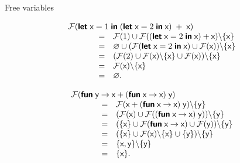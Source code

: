 %
\begin{frame}{Free variables}

  \begin{equation*}
    \begin{array}{lcl}
      \multicolumn{3}{l}{
        \FV{\Xlet \; \textsf{x} = 1 \;
          \Xin \; (\Xlet \; \textsf{x} = 2 \;
          \Xin \; \textsf{x}) \; + \; \textsf{x}}} \\
      \phantom{XXX} &=& \FV{1} \cup \FV{(\Xlet \; \textsf{x}
        = 2 \; \Xin \; \textsf{x}) +
        \textsf{x}} \backslash \{\textsf{x}\}\\
      \phantom{XXX} &=& \varnothing \cup (\FV{\Xlet \;
        \textsf{x} = 2 \; \Xin \;
        \textsf{x}} \cup \FV{\textsf{x}}) \backslash \{\textsf{x}\}\\
      \phantom{XXX} &=& (\FV{2} \cup \FV{\textsf{x}} \backslash
      \{\textsf{x}\}  \cup \FV{\textsf{x}}) \backslash
      \{\textsf{x}\}\\
      \phantom{XXX} &=& \FV{\textsf{x}} \backslash \{\textsf{x}\}\\
      \phantom{XXX} &=& \varnothing.
    \end{array}
  \end{equation*}

  \bigskip

  \begin{equation*}
    \begin{array}{lcl}
      \multicolumn{3}{l}{ \FV{\Xfun \; \textsf{y} \rightarrow
          \textsf{x} + (\Xfun \; \textsf{x}
          \rightarrow \textsf{x}) \; \textsf{y}}}\\ \phantom{X}
      &=& \FV{\textsf{x} + (\Xfun \; \textsf{x} \rightarrow
        \textsf{x}) \; \textsf{y}} \backslash
      \{\textsf{y}\}\\ \phantom{X} &=& (\FV{\textsf{x}} \cup
      \FV{(\Xfun \; \textsf{x} \rightarrow \textsf{x})
        \; \textsf{y}}) \backslash \{\textsf{y}\}\\ \phantom{X} &=&
      (\{\textsf{x}\} \cup \FV{\Xfun \; \textsf{x}
        \rightarrow \textsf{x}} \cup \FV{\textsf{y}})
      \backslash \{\textsf{y}\}\\ \phantom{X} &=& (\{\textsf{x}\}
      \cup \FV{\textsf{x}} \backslash \{\textsf{x}\} \cup
      \{\textsf{y}\}) \backslash \{\textsf{y}\}\\ \phantom{XXX} &=&
      \{\textsf{x}, \textsf{y}\} \backslash
      \{\textsf{y}\}\\ \phantom{X} &=& \{\textsf{x}\}.
    \end{array}
  \end{equation*}

\end{frame}

